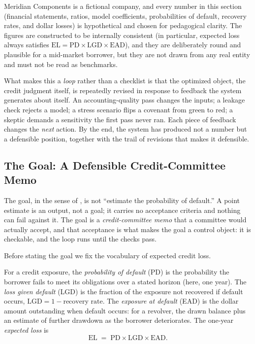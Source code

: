 \begin{remark}
Meridian Components is a fictional company, and every number in this section
(financial statements, ratios, model coefficients, probabilities of default,
recovery rates, and dollar losses) is hypothetical and chosen for pedagogical
clarity. The figures are constructed to be internally consistent (in particular,
expected loss always satisfies $\mathrm{EL} = \mathrm{PD}\times\mathrm{LGD}\times
\mathrm{EAD}$), and they are deliberately round and plausible for a mid-market
borrower, but they are not drawn from any real entity and must not be read as
benchmarks.
\end{remark}

What makes this a \emph{loop} rather than a checklist is that the optimized object,
the credit judgment itself, is repeatedly revised in response to feedback the
system generates about itself. An accounting-quality pass changes the inputs; a
leakage check rejects a model; a stress scenario flips a covenant from green to
red; a skeptic demands a sensitivity the first pass never ran. Each piece of
feedback changes the \emph{next} action. By the end, the system has produced not a
number but a defensible position, together with the trail of revisions
that makes it defensible.

\subsection{The Goal: A Defensible Credit-Committee Memo}\label{subsec:credit-goal}

The goal, in the sense of , is not ``estimate the
probability of default.'' A point estimate is an output, not a goal; it carries no
acceptance criteria and nothing can fail against it. The goal is a
\emph{credit-committee memo} that a committee would actually accept, and that
acceptance is what makes the goal a control object: it is checkable, and the loop
runs until the checks pass.

Before stating the goal we fix the vocabulary of expected credit loss.

\begin{definition}\label{def:el-decomposition}
For a credit exposure, the \emph{probability of default} (PD) is the probability
the borrower fails to meet its obligations over a stated horizon (here, one year).
The \emph{loss given default} (LGD) is the fraction of the exposure not recovered
if default occurs, $\mathrm{LGD} = 1 - \text{recovery rate}$. The \emph{exposure
at default} (EAD) is the dollar amount outstanding when default occurs: for a
revolver, the drawn balance plus an estimate of further drawdown as the borrower
deteriorates. The one-year \emph{expected loss} is
\begin{equation}\label{eq:expected-loss}
  \mathrm{EL} \;=\; \mathrm{PD}\times \mathrm{LGD}\times \mathrm{EAD}.
\end{equation}
\end{definition}

